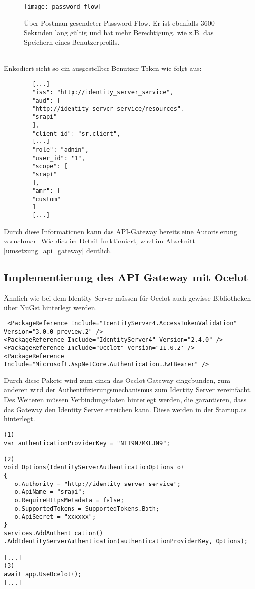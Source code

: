 \begin{figure}[!ht]
	\centering
	\texttt{[image: password\_flow]}
	\caption[Über Postman gesendeter Password Flow] {Über Postman gesendeter Password Flow. Er ist ebenfalls 3600 Sekunden lang gültig und hat mehr Berechtigung, wie z.B. das Speichern eines Benutzerprofils.}
	\label{fig:password_flow}
\end{figure} \\

Enkodiert sieht so ein ausgestellter Benutzer-Token wie folgt aus: \\

\begin{verbatim}
		[...]
		"iss": "http://identity_server_service",
		"aud": [
		"http://identity_server_service/resources",
		"srapi"
		],
		"client_id": "sr.client",
		[...]
		"role": "admin",
		"user_id": "1",
		"scope": [
		"srapi"
		],
		"amr": [
		"custom"
		]
		[...]
\end{verbatim}  

Durch diese Informationen kann das API-Gateway bereits eine Autorisierung vornehmen. Wie dies im Detail funktioniert, wird im Abschnitt \ref{umsetzung_api_gateway} deutlich. 

\subsection{Implementierung des API Gateway mit Ocelot}\label{sec:umsetzung_api_gateway}

Ähnlich wie bei dem Identity Server müssen für Ocelot auch gewisse Bibliotheken über NuGet hinterlegt werden.

\begin{verbatim}
 <PackageReference Include="IdentityServer4.AccessTokenValidation" Version="3.0.0-preview.2" />
<PackageReference Include="IdentityServer4" Version="2.4.0" />
<PackageReference Include="Ocelot" Version="11.0.2" />
<PackageReference Include="Microsoft.AspNetCore.Authentication.JwtBearer" />
\end{verbatim}

Durch diese Pakete wird zum einen das Ocelot Gateway eingebunden, zum anderen wird der Authentifizierungsmechanismus zum Identity Server vereinfacht. Des Weiteren müssen Verbindungsdaten hinterlegt werden, die garantieren, dass das Gateway den Identity Server erreichen kann. Diese werden in der Startup.cs hinterlegt.

\begin{verbatim}
(1)
var authenticationProviderKey = "NTT9N7MXLJN9";

(2)
void Options(IdentityServerAuthenticationOptions o)
{
   o.Authority = "http://identity_server_service";
   o.ApiName = "srapi";
   o.RequireHttpsMetadata = false;
   o.SupportedTokens = SupportedTokens.Both;
   o.ApiSecret = "xxxxxx";
}
services.AddAuthentication()
.AddIdentityServerAuthentication(authenticationProviderKey, Options);

[...]
(3)
await app.UseOcelot();
[...]
\end{verbatim}

